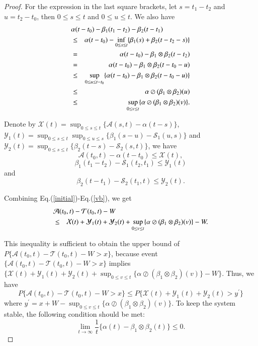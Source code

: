 \documentclass[paper]{ieice}
\newtheorem{proof}{Proof}
\begin{document}
\begin{proof}
For the expression in the last square brackets, let $s=t_{1}-t_{2}$ and $u=t_{2}-t_{0}$, then $0\leq s\leq t$ and $0\leq u\leq t$. We also have
\begin{eqnarray}
  \lefteqn{\alpha(t-t_{0})-\beta_1(t_{1}-t_{2})-\beta_2(t-t_1)}\nonumber\\
  &\leq &\alpha(t-t_{0})-\inf_{0\leq s\leq t}\{\beta_1(s)+\beta_2(t-t_2-s)\}\nonumber\\
  &=&\alpha(t-t_{0})-\beta_1\otimes\beta_2(t-t_{2})\nonumber\\
  &=&\alpha(t-t_{0})-\beta_1\otimes\beta_2(t-t_{0}-u)\nonumber\\
  &\leq & \sup_{0\leq u\leq t-t_0}\{\alpha(t-t_0)-\beta_1\otimes\beta_2(t-t_0-u)\}\nonumber\\
  &\leq& \alpha\oslash(\beta_1\otimes\beta_2)(u)\nonumber\\
  &\leq & \sup_{0\leq v\leq t}\{\alpha\oslash(\beta_1\otimes\beta_2)(v)\}.\label{curve}
\end{eqnarray}

Denote by $\mathcal{X}(t)=\sup_{0\leq s\leq t}\{\mathcal{A}(s,t)-\alpha(t-s)\}$, $\mathcal{Y}_1(t)=\sup_{0\leq s\leq t}\sup_{0\leq u\leq s}\{\beta_1(s-u)-\mathcal{S}_1(u,s)\}$ and $\mathcal{Y}_2(t)=\sup_{0\leq s\leq t}\{\beta_2(t-s)-\mathcal{S}_2(s,t)\}$, we have
\begin{equation}\label{vbc}
\mathcal{A}(t_{0},t)-\alpha(t-t_{0})\leq \mathcal{X}(t),
\end{equation}
\begin{equation}\label{mb}
\beta_1(t_1-t_{2})-\mathcal{S}_1(t_{2},t_1)\leq \mathcal{Y}_1(t)
\end{equation}
and
\begin{equation}\label{vb}
\beta_2(t-t_{1})-\mathcal{S}_2(t_{1},t)\leq \mathcal{Y}_2(t).
\end{equation}

Combining Eq.(\ref{initial})-Eq.(\ref{vb}), we get
\begin{eqnarray*}
\lefteqn{\mathcal{A}(t_0,t)-\mathcal{T}(t_0,t)-W}\\
&\leq& \mathcal{X}(t)+\mathcal{Y}_1(t)+\mathcal{Y}_2(t)+\sup_{0\leq v\leq t}\{\alpha\oslash(\beta_1\otimes\beta_2)(v)\}-W.
\end{eqnarray*}

This inequality is sufficient to obtain the upper bound of $P\{\mathcal{A}(t_0,t)-\mathcal{T}(t_0,t)-W>x\}$, because event $\{\mathcal{A}(t_0,t)-\mathcal{T}(t_0,t)-W>x\}$ implies $\{\mathcal{X}(t)+\mathcal{Y}_1(t)+\mathcal{Y}_2(t)+\sup_{0\leq v\leq t}\{\alpha\oslash(\beta_1\otimes\beta_2)(v)\}-W\}$. Thus, we have
$$P\{\mathcal{A}(t_0,t)-\mathcal{T}(t_0,t)-W>x\}\leq P\{\mathcal{X}(t)+\mathcal{Y}_1(t)+\mathcal{Y}_2(t)>y^\prime\}$$
where $y^\prime=x+W-\sup_{0\leq v\leq t}\{\alpha\oslash(\beta_1\otimes\beta_2)(v)\}$. To keep the system stable, the following condition should be met:
$$\lim_{t\to \infty}\frac{1}{t}\{\alpha(t)-\beta_1\otimes\beta_2(t)\}\leq 0.$$


\end{proof}
\end{document}
